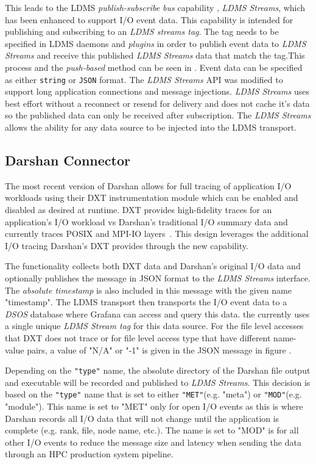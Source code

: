 This leads to the LDMS \emph{publish-subscribe bus} capability , \emph{LDMS Streams}, which has been enhanced to support I/O event data. This capability is intended for publishing and subscribing to an \emph{LDMS streams tag}. The tag needs to be specified in LDMS daemons and \emph{plugins} in order to publish event data to \emph{LDMS Streams} and receive this published \emph{LDMS Streams} data that match the tag.This process and the \emph{push-based} method can be seen in . Event data can be specified as either \texttt{string} or \texttt{JSON} format. The \emph{LDMS Streams} API was modified to support long application connections and message injections. \emph{LDMS Streams} uses best effort without a reconnect or resend for delivery and does not cache it's data so the published data can only be received after subscription. The \emph{LDMS Streams} allows the ability for any data source to be injected into the LDMS transport.

\subsection{Darshan Connector}

The most recent version of Darshan allows for full tracing of application I/O workloads using their DXT instrumentation module which can be enabled and disabled as desired at runtime. DXT provides high-fidelity traces for an application's I/O workload vs Darshan's traditional I/O summary data and currently traces POSIX and MPI-IO layers~\cite{darshan-runtime}. This design leverages the additional I/O tracing Darshan's DXT provides through the new \connector capability.


The \connector functionality collects both DXT data and Darshan's original I/O data and optionally publishes the message in JSON format to the \emph{LDMS Streams} interface. The \emph{absolute timestamp} is also included in this message with the given name "timestamp". The LDMS transport then transports the I/O event data to a \emph{DSOS} database where Grafana can access and query this data. the \connector currently uses a single unique \emph{LDMS Stream tag} for this data source. For the file level accesses that DXT does not trace or for file level access type that have different name-value pairs, a value of "N/A" or "-1" is given in the JSON message in figure . 

Depending on the \texttt{"type"} name, the absolute directory of the Darshan file output and executable will be recorded and published to \emph{LDMS Streams}. This decision is based on the \texttt{"type"} name that is set to either \texttt{"MET"}(e.g. "meta") or \texttt{"MOD"}(e.g. "module"). This name is set to "MET" only for open I/O events as this is where Darshan records all I/O data that will not change until the application is complete (e.g. rank, file, node name, etc.). The name is set to "MOD" is for all other I/O events to reduce the message size and latency when sending the data through an HPC production system pipeline.

